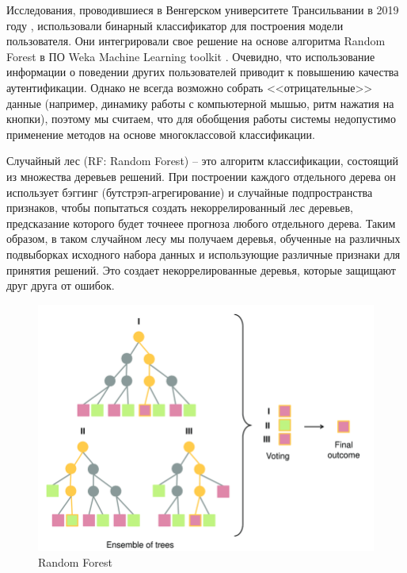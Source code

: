 \documentclass[12pt]{article}
\begin{document}
    \par Исследования, проводившиеся в Венгерском университете Трансильвании в 2019 году \cite{Antal}, использовали бинарный классификатор для построения модели пользователя. Они интегрировали свое решение на основе алгоритма Random Forest в ПО Weka Machine Learning toolkit \cite{Weka}. Очевидно, что использование информации о поведении других пользователей приводит к повышению качества аутентификации. Однако не всегда возможно собрать <<отрицательные>> данные (например, динамику работы с компьютерной мышью, ритм нажатия на кнопки), поэтому мы считаем, что для обобщения работы системы недопустимо применение методов на основе многоклассовой классификации.

    \par Случайный лес (RF: Random Forest) \cite{RF} -- это алгоритм классификации, состоящий из множества деревьев решений. При построении каждого отдельного дерева он использует бэггинг (бутстрэп-агрегирование) \cite{Bagging} и случайные подпространства признаков, чтобы попытаться создать некоррелированный лес деревьев, предсказание которого будет точнеее прогноза любого отдельного дерева. Таким образом, в таком случайном лесу мы получаем деревья, обученные на различных подвыборках исходного набора данных и использующие различные признаки для принятия решений. Это создает некоррелированные деревья, которые защищают друг друга от ошибок.
    \vspace{5mm}

    \begin{figure}[h!]
        \centering
        \includegraphics[width=0.9\linewidth]{RandomForest.png}
        \caption{Random Forest}
        \label{sec:Overview:Model:fig:RandomForest}
    \end{figure}
\end{document}
